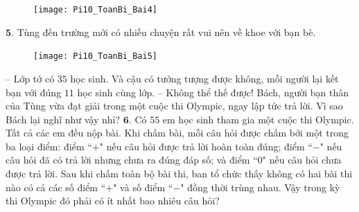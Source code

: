 \begin{multicols}{2}
\begin{figure}[H]
			\centering
			\vspace*{-5pt}
			\captionsetup{labelformat= empty, justification=centering}
			\texttt{[image: Pi10\_ToanBi\_Bai4]}
			\vspace*{-15pt}
		\end{figure}
	$\pmb{5.}$ Tùng đến trường mới có nhiều chuyện rất vui nên về khoe với bạn bè.
	\begin{figure}[H]
			\centering
			\captionsetup{labelformat= empty, justification=centering}
			\texttt{[image: Pi10\_ToanBi\_Bai5]}
			\vspace*{-15pt}
		\end{figure}
	-- Lớp tớ có $35$ học sinh. Và cậu có tưởng tượng được không, mỗi người lại kết bạn với đúng $11$ học sinh cùng lớp.
	\vskip 0.1cm
	-- Không thể thế được! Bách, người bạn thân của Tùng vừa đạt giải trong một cuộc thi Olympic, ngay lập tức trả lời.
	\vskip 0.1cm
	Vì sao Bách lại nghĩ như vậy nhỉ?
	\vskip 0.1cm
	$\pmb{6.}$ Có $55$ em học sinh tham gia một cuộc thi Olympic. Tất cả các em đều nộp bài. Khi chấm bài, mỗi câu hỏi được chấm bởi một trong ba loại điểm: điểm ``$+$" nếu câu hỏi được trả lời hoàn toàn đúng; điểm ``$-$" nếu câu hỏi đã có trả lời nhưng chưa ra đúng đáp số; và điểm ``$0$" nếu câu hỏi chưa được trả lời. Sau khi chấm toàn bộ bài thi, ban tổ chức thấy không có hai bài thi nào có cả các số điểm ``$+$" và số điểm ``$-$" đồng thời trùng nhau. Vậy trong kỳ thi Olympic đó phải có ít nhất bao nhiêu câu hỏi?
\end{multicols}

